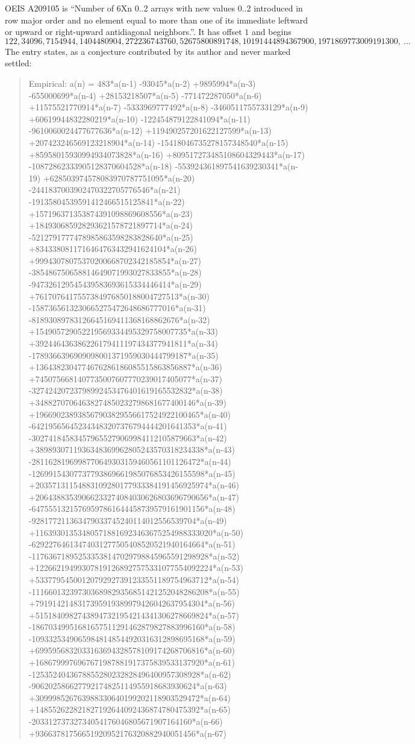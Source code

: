 \documentclass[11pt,a4paper]{article}
\theoremstyle{plain}
\theoremstyle{definition}
\begin{document}
OEIS A209105 is ``Number of 6Xn 0..2 arrays with new values 0..2 introduced in row major order and no element equal to more than one of its immediate leftward or upward or right-upward antidiagonal neighbors.''. It has offset $1$ and begins
\[
122, 34096, 7154944, 1404480904, 272236743760, 52675800891748, 10191444894367900, 1971869773009191300,\ \dots
\]
The entry states, as a conjecture contributed by its author and never marked settled:
\begin{quote}
Empirical: a(n) = 483*a(n-1) -93045*a(n-2) +9895994*a(n-3) -655000699*a(n-4) +28153218507*a(n-5) -771472287050*a(n-6) +11575521770914*a(n-7) -5333969777492*a(n-8) -3460511755733129*a(n-9) +60619944832280219*a(n-10) -122454879122841094*a(n-11) -9610060024477677636*a(n-12) +119490257201622127599*a(n-13) +207423246569123218904*a(n-14) -15418046735278157348540*a(n-15) +85958015930994934073828*a(n-16) +809517273485108604329443*a(n-17) -10872862333905128370604528*a(n-18) -553924361897541639230341*a(n-19) +628503974578083970787751095*a(n-20) -2441837003902470322705776546*a(n-21) -19135804539591412466515125841*a(n-22) +157196371353874391098869608556*a(n-23) +184930685928293621578721897714*a(n-24) -5212791777478985863598283828640*a(n-25) +8343380811716464763432941624104*a(n-26) +99943078075370200668702342185854*a(n-27) -385486750658814649071993027833855*a(n-28) -947326129545439583693615334446414*a(n-29) +7617076417557384976850188004727513*a(n-30) -1587365613230665275472648686777016*a(n-31) -81893089783126645169411368168862676*a(n-32) +154905729052219569334495329758007735*a(n-33) +392446436386226179411197434377941811*a(n-34) -1789366396909098001371959030444799187*a(n-35) +1364382304774676286186085515863856887*a(n-36) +7450756681407735007607770239017405077*a(n-37) -32742420723798992453476401619165532832*a(n-38) +34882707064638274850232798681677400146*a(n-39) +196690238938567903829556617524922100465*a(n-40) -642195656452343483207376794444201641353*a(n-41) -302741845834579655279069984112105879663*a(n-42) +3898930711936348369962805243570318234338*a(n-43) -2811628196998770649303159460561101126472*a(n-44) -12699154307737793869661985076853426155598*a(n-45) +20357131154883109280177933384191456925974*a(n-46) +20643883539066233274084030626803696790656*a(n-47) -64755513215769597861644458739579161901156*a(n-48) -928177211363479033745240114012556539704*a(n-49) +116393013534805718816923463675254988333020*a(n-50) -62922764613474031277505408520521940164664*a(n-51) -117636718952533538147029798845965591298928*a(n-52) +122662194993078191268927575331077554092224*a(n-53) +53377954500120792927391233551189754963712*a(n-54) -111660132397303689829356851421252048286208*a(n-55) +7919142148317395919389979426042637954304*a(n-56) +51518409827438947321954214341306278669824*a(n-57) -18670349951681657511291462879827883996160*a(n-58) -10933253490659848148544920316312898695168*a(n-59) +6995956832033163694328578109174268706816*a(n-60) +1686799976967671987881917375839533137920*a(n-61) -1253524043678855280232828496400957308928*a(n-62) -906202586627792174825114955918683930624*a(n-63) +309998526763988330640199202118903529472*a(n-64) +148552622821827192644092436874780475392*a(n-65) -20331273732734054176046805671907164160*a(n-66) +93663781756651920952176320882940051456*a(n-67) 
\end{quote}
\end{document}
